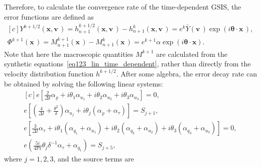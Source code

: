 \documentclass[onefignum,onetabnum]{siamart171218}
\begin{document}
Therefore,
to calculate the convergence rate of the time-dependent GSIS, the error functions are defined as
\begin{equation}\label{Y_ansatz2_time_dependent} 
\begin{aligned}[c]
Y^{k+1/2}(\bm{x},\bm{{v}}\,)=h_{n+1}^{k+1/2}(\bm{x},\bm{{v}}\,)-h_{n+1}^{k}(\bm{x},\bm{{v}}\,)=e^{k}\bar{Y}(\bm{{v}}\,)\exp(i\bm{\theta}\cdot{\bm{x}}\,),\\
\Phi^{k+1}(\bm{x}\,)=M_{n+1}^{k+1}(\bm{x}\,)-M_{n+1}^{k}(\bm{x}\,)=e^{k+1}\alpha\exp(i\bm{\theta}\cdot{\bm{x}}).
\end{aligned}
\end{equation}
Note that here the macroscopic quantities $M^{k+1}$ are calculated from the synthetic equations~\eqref{eq123_lin_time_dependent}, rather than directly from the velocity distribution function $h^{k+1/2}$. After some algebra, the error decay rate can be obtained by solving the following linear systems:
\begin{equation}\label{L_lin2_time_dependent}
\begin{aligned}[c]
e\left[\frac{2}{\Delta{t}}\alpha_\varrho+i\theta_1\alpha_{u_1}+i\theta_2\alpha_{u_2}+i\theta_3\alpha_{u_3}\right]=0, \\
e\left[\left( \frac{4}{\Delta{t}}+\frac{{\theta}^2}{\delta} \right)\alpha_{u_j}+i\theta_j(\alpha_\varrho+\alpha_{\tau})\right]=S_{j+1}, \\
e\left[\frac{3}{\Delta{t}}\alpha_{\tau}
+i\theta_1(\alpha_{q_1}+\alpha_{u_1})
+i\theta_2(\alpha_{q_2}+\alpha_{u_2})
+i\theta_3(\alpha_{q_3}+\alpha_{u_3})\right]=0,\\
e\left(\frac{5i}{4\text{Pr}}\theta_j{\delta^{-1}}\alpha_{\tau}+\alpha_{q_1}\right)=S_{j+5},
\end{aligned}
\end{equation}
where $j=1,2,3$, and the source terms are 
\end{document}
